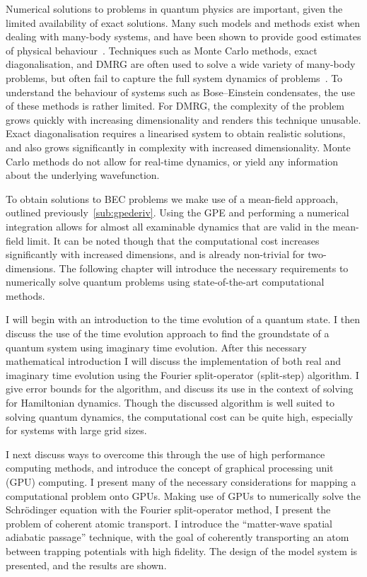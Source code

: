 Numerical solutions to problems in quantum physics are important, given the limited availability of exact solutions. Many such models and methods exist when dealing with many-body systems, and have been shown to provide good estimates of physical behaviour~\cite{BK:Krauth_2006}. Techniques such as Monte Carlo methods, exact diagonalisation, and DMRG are often used to solve a wide variety of many-body problems, but often fail to capture the full system dynamics of problems~\cite{NUM:Schollwock_rmp_2005}. To understand the behaviour of systems such as Bose--Einstein condensates, the use of these methods is rather limited. For DMRG, the complexity of the problem grows quickly with increasing dimensionality and renders this technique unusable. Exact diagonalisation requires a linearised system to obtain realistic solutions, and also grows significantly in complexity with increased dimensionality. Monte Carlo methods do not allow for real-time dynamics, or yield any information about the underlying wavefunction.

To obtain solutions to BEC problems we make use of a mean-field approach, outlined previously~\ref{sub:gpederiv}. Using the GPE and performing a numerical integration allows for almost all examinable dynamics that are valid in the mean-field limit. It can be noted though that the computational cost increases significantly with increased dimensions, and is already non-trivial for two-dimensions. The following chapter will introduce the necessary requirements to numerically solve quantum problems using state-of-the-art computational methods.

I will begin with an introduction to the time evolution of a quantum state. I then discuss the use of the time evolution approach to find the groundstate of a quantum system using imaginary time evolution. After this necessary mathematical introduction I will discuss the implementation of both real and imaginary time evolution using the Fourier split-operator (split-step) algorithm. I give error bounds for the algorithm, and discuss its use in the context of solving for Hamiltonian dynamics. Though the discussed algorithm is well suited to solving quantum dynamics, the computational cost can be quite high, especially for systems with large grid sizes.

I next discuss ways to overcome this through the use of high performance computing methods, and introduce the concept of graphical processing unit (GPU) computing. I present many of the necessary considerations for mapping a computational problem onto GPUs. Making use of GPUs to numerically solve the Schr\"odinger equation with the Fourier split-operator method, I present the problem of coherent atomic transport. I introduce the ``matter-wave spatial adiabatic passage'' technique, with the goal of coherently transporting an atom between trapping potentials with high fidelity. The design of the model system is presented, and the results are shown.

